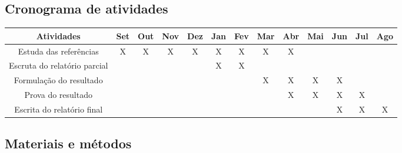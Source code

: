 \documentclass[a4paper,12pt]{article}
\begin{document}
\subsection{Cronograma de atividades}


\begin{adjustbox}{width={\textwidth},totalheight={\textheight},keepaspectratio}%
    \centering
    \begin{tabular}{|c|c|c|c|c|c|c|c|c|c|c|c|c|}
        \hline
        \textbf{Atividades}          & \textbf{Set} & \textbf{Out} & \textbf{Nov} & \textbf{Dez} & \textbf{Jan} & \textbf{Fev} & \textbf{Mar} & \textbf{Abr} & \textbf{Mai} & \textbf{Jun} & \textbf{Jul} & \textbf{Ago} \\
        \hline
        Estuda das referências       & X            & X            & X            & X            & X            & X            & X            & X            &              &              &              &              \\
        \hline
        Escruta do relatório parcial &              &              &              &              & X            & X            &              &              &              &              &              &              \\
        \hline
        Formulação do resultado      &              &              &              &              &              &              & X            & X            & X            & X            &              &              \\
        \hline
        Prova do resultado           &              &              &              &              &              &              &              & X            & X            & X            & X            &              \\
        \hline
        Escrita do relatório final   &              &              &              &              &              &              &              &              &              & X            & X            & X            \\
        \hline
    \end{tabular}
\end{adjustbox}


\subsection{Materiais e métodos}
\end{document}
